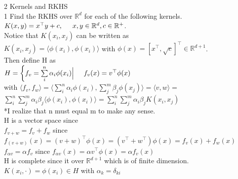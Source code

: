 \documentclass[18pt]{article}
\author{Adam Handwerger}
\begin{document}
\begin{flushleft}
2 Kernels and RKHS\\
\vspace{.4cm}
1 Find the RKHS over $\mathbb{R}^d$ for each of the following kernels.\\
\vspace{.4cm}
$K(x,y)=x^{\top}y+c,\hspace{.5cm} x,y\in\mathbb{R}^d, c\in \mathbb{R}^{+}$.\\
\vspace{.4cm}
Notice that $K(x_i,x_j)$ can be written as\\
\vspace{.4cm}
$K(x_i,x_j)=\langle\phi(x_i),\phi(x_i)\rangle$ with $\phi(x)=[x^{\top},\sqrt{c}]^{\top}\in\mathbb{R}^{d+1}$.\\
\vspace{.4cm}
Then define H as\\
\vspace{.4cm}
$H=\left\{f_v=\sum\limits_i^n \alpha_i \phi(x_i) \Big| \hspace{.5cm} f_v(x)=v^{\top}\phi(x)\right.$\\
\hspace{1cm} with $\langle f_v,f_w\rangle =\langle \sum\limits_i^n \alpha_i\phi(x_i),\sum\limits_j^m \beta_j \phi(x_j)\rangle=\langle v,w \rangle=$\\
\hspace{1cm}$\sum\limits_i^n\sum\limits_j^m \alpha_i \beta_j\langle\phi(x_i),\phi(x_i)\rangle=\sum\limits_i^n\sum\limits_j^m \alpha_i \beta_j K(x_i,x_j)$\\
\vspace{.4cm}
*I realize that n must equal m to make any sense.\\
\vspace{.4cm}
H is a vector space since\\
\vspace{.4cm}
$f_{v+w}=f_{v}+f_{w}$ since $f_{(v+w)}(x)=(v+w)^{\top}\phi(x)=(v^{\top}+w^{\top})\phi(x)=f_{v}(x)+f_{w}(x)$\\
$f_{\alpha v}=\alpha f_{v}$ since $f_{\alpha v}(x)=\alpha v^{\top}\phi(x)=\alpha f_v(x)$\\
\vspace{.4cm}
H is complete since it over $\mathbb{R}^{d+1}$ which is of finite dimension.\\
\vspace{.4cm}
$K(x_i,\cdot)=\phi(x_i)\in H$ with $\alpha_k=\delta_{ki}$\\
\vspace{.4cm}

\end{flushleft}
\end{document}
